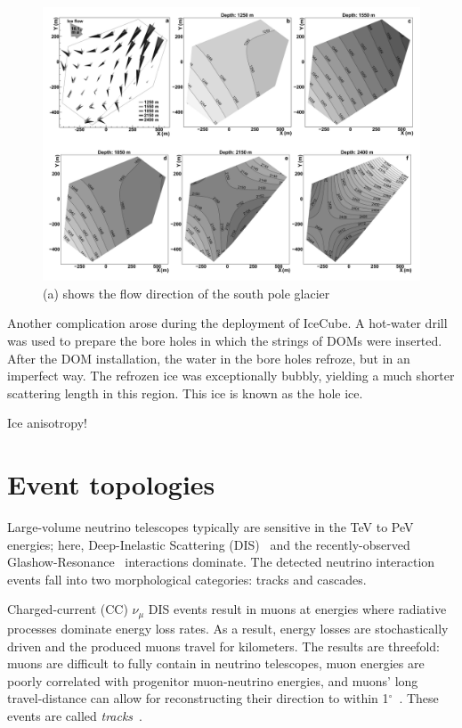 \documentclass[main.tex]{subfiles}
\begin{document}
\begin{figure}  
    \centering
    \includegraphics[width=0.8\linewidth]{figures/icecube_isochron.png}
    \caption{(a) shows the flow direction of the south pole glacier}\label{fig:isochron}
\end{figure}


Another complication arose during the deployment of IceCube. 
A hot-water drill was used to prepare the bore holes in which the strings of DOMs were inserted. 
After the DOM installation, the water in the bore holes refroze, but in an imperfect way.
The refrozen ice was exceptionally bubbly, yielding a much shorter scattering length in this region.
This ice is known as the  hole ice. 

Ice anisotropy! 

\section{Event topologies}

Large-volume neutrino telescopes typically are sensitive in the TeV to PeV energies; here, Deep-Inelastic Scattering (DIS)~\cite{gandhineutrinos} and the recently-observed~\cite{IceCube:2021rpz} Glashow-Resonance~\cite{PhysRev.118.316} interactions dominate. 
The detected neutrino interaction events fall into two morphological categories: tracks and cascades.

Charged-current (CC) $\nu_{\mu}$ DIS events result in muons at energies where radiative processes dominate energy loss rates.
As a result, energy losses are stochastically driven and the produced muons travel for kilometers. 
The results are threefold: muons are difficult to fully contain in neutrino telescopes, muon energies are poorly correlated with progenitor muon-neutrino energies, and muons' long travel-distance can allow for reconstructing their direction to within 1$^{\circ}$~\cite{trackaccuracy2017}. These events are called \textit{tracks}~\cite{icecube_energy_reco}.
\end{document}
